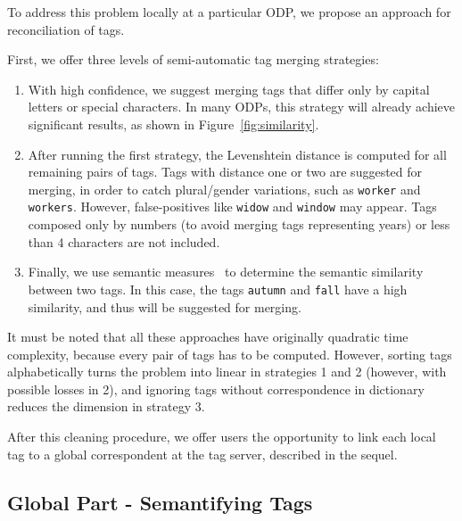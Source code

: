 To address this problem locally at a particular ODP, we propose an approach for reconciliation of tags. %

First, we offer three levels of semi-automatic tag merging strategies:


\begin{enumerate}
	\item With high confidence, we suggest merging tags that differ only by capital letters or special characters. 
In many ODPs, this strategy will already achieve significant results, as shown in Figure~\ref{fig:similarity}.
	\item After running the first strategy, the Levenshtein distance is computed for all remaining pairs of tags.
Tags with distance one or two are suggested for merging, in order to catch plural/gender variations, such as \texttt{worker} and \texttt{workers}. 
However, false-positives like \texttt{widow} and \texttt{window} may appear.
Tags composed only by numbers (to avoid merging tags representing years) or less than 4 characters are not included.
	\item Finally, we use semantic measures~\cite{Harispe01032014} to determine the semantic similarity between two tags. 
In this case, the tags \texttt{autumn} and \texttt{fall} have a high similarity, and thus will be suggested for merging.
\end{enumerate}

It must be noted that all these approaches have originally quadratic time complexity, because every pair of tags has to be computed. However, sorting tags alphabetically turns the problem into linear in strategies 1 and 2 (however, with possible losses in 2), and ignoring tags without correspondence in dictionary reduces the dimension in strategy 3.

After this cleaning procedure, we offer users the opportunity to link each local tag to a global correspondent at the tag server, described in the sequel.

\subsection{Global Part - Semantifying Tags}
\label{sec:global}

